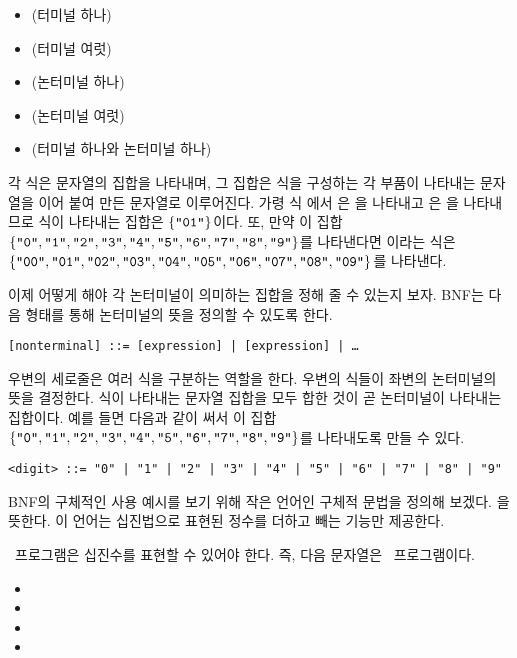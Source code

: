 \begin{itemize}
  \item {} (터미널 하나) 
  \item {} (터미널 여럿) 
  \item {} (논터미널 하나)
  \item {} (논터미널 여럿)
  \item {} (터미널 하나와 논터미널 하나)
\end{itemize}

각 식은 문자열의 집합을 나타내며, 그 집합은 식을 구성하는 각 부품이 나타내는
문자열을 이어 붙여 만든 문자열로 이루어진다. 가령 식 에서
은 을 나타내고 은 을 나타내므로 식이
나타내는 집합은 $\{\texttt{"01"}\}$이다. 또, 만약 이 집합
$\{\texttt{"0"},\texttt{"1"},\texttt{"2"},\texttt{"3"},\texttt{"4"},\texttt{"5"},\texttt{"6"},\texttt{"7"},\texttt{"8"},\texttt{"9"}\}$를
나타낸다면 이라는 식은
$\{\texttt{"00"},\texttt{"01"},\texttt{"02"},\texttt{"03"},\texttt{"04"},\texttt{"05"},\texttt{"06"},\texttt{"07"},\texttt{"08"},\texttt{"09"}\}$를
나타낸다.

이제 어떻게 해야 각 논터미널이 의미하는 집합을 정해 줄 수 있는지 보자. BNF는
다음 형태를 통해 논터미널의 뜻을 정의할 수 있도록 한다.

\begin{verbatim}
[nonterminal] ::= [expression] | [expression] | …
\end{verbatim}

우변의 세로줄은 여러 식을 구분하는 역할을 한다. 우변의 식들이 좌변의 논터미널의
뜻을 결정한다. 식이 나타내는 문자열 집합을 모두 합한 것이 곧 논터미널이 나타내는
집합이다. 예를 들면 다음과 같이 써서 이 집합
$\{\texttt{"0"},\texttt{"1"},\texttt{"2"},\texttt{"3"},\texttt{"4"},\texttt{"5"},\texttt{"6"},\texttt{"7"},\texttt{"8"},\texttt{"9"}\}$를
나타내도록 만들 수 있다.

\begin{verbatim}
<digit> ::= "0" | "1" | "2" | "3" | "4" | "5" | "6" | "7" | "8" | "9"
\end{verbatim}

BNF의 구체적인 사용 예시를 보기 위해 작은 언어인  구체적 문법을 정의해
보겠다.  을 뜻한다. 이 언어는 십진법으로
표현된 정수를 더하고 빼는 기능만 제공한다.

\Lang~프로그램은 십진수를 표현할 수 있어야 한다. 즉, 다음 문자열은 \Lang~프로그램이다.

\begin{itemize}
  \item {}
  \item {}
  \item {}
  \item {}
\end{itemize}

